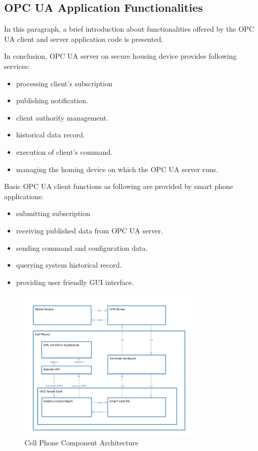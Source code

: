 \subsection{OPC UA Application Functionalities}\label{secFunction}
In this paragraph, a brief introduction about functionalities offered by  the OPC UA  client and server application code is presented.

In conclusion, OPC UA server on secure housing device provides following services:
 \begin{itemize}
  \item processing client's subscription
  \item publishing notification.
  \item client authority management.
  \item historical data record.
  \item execution of client's command.
  \item managing the homing device on which the OPC UA server runs.
\end{itemize}
Basic OPC UA client functions as following are provided by smart phone applications:
 \begin{itemize}
  \item submitting subscription
  \item receiving published data from OPC UA server.
  \item sending command and configuration data.
  \item querying system historical record.
  \item providing user friendly GUI interface.
\end{itemize}


 \begin{figure}[!htb]
	\centering
	\includegraphics[width=0.78\textwidth]{clientStructure}
		\caption{Cell Phone Component Architecture}
	\label{fig:clientStructure}
\end{figure}

